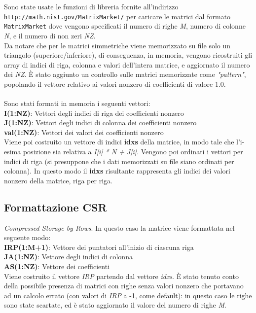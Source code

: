 \documentclass[12pt,halfline,a4paper]{ouparticle}
\begin{document}
Sono state usate le funzioni di libreria fornite all'indirizzo \verb+http://math.nist.gov/MatrixMarket/+ per caricare le matrici dal formato \verb+MatrixMarket+ dove vengono specificati il numero di righe \textit{M}, numero di colonne \textit{N}, e il numero di non zeri \textit{NZ}.\\
Da notare che per le matrici simmetriche viene memorizzato su file solo un triangolo (superiore/inferiore), di conseguenza, in memoria, vengono ricostruiti gli array di indici di riga, colonna e valori dell'intera matrice, e aggiornato il numero dei \textit{NZ}.
È stato aggiunto un controllo sulle matrici memorizzate come \textit{"pattern"}, popolando il vettore relativo ai valori nonzero di coefficienti di valore 1.0.\\\\
Sono stati formati in memoria i seguenti vettori:\\
\indent\textbf{I(1:NZ)}: Vettori degli indici di riga dei coefficienti nonzero\\
\indent\textbf{J(1:NZ)}: Vettori degli indici di colonna dei coefficienti nonzero\\
\indent\textbf{val(1:NZ)}: Vettori dei valori dei coefficienti nonzero\\
Viene poi costruito un vettore di indici \textbf{idxs} della matrice, in modo tale che l'i-esima posizione sia relativa a \textit{I[i] * N + J[i]}. Vengono poi ordinati i vettori per indici di riga (si presuppone che i dati memorizzati su file siano ordinati per colonna). In questo modo il \textbf{idxs} risultante rappresenta gli indici dei valori nonzero della matrice, riga per riga.\\


\subsection{Formattazione CSR}
\label{sec2.2}

\textit{Compressed Storage by Rows}. In questo caso la matrice viene formattata nel seguente modo:\\
\indent\textbf{IRP(1:M+1)}: Vettore dei puntatori all’inizio di ciascuna riga\\
\indent\textbf{JA(1:NZ)}: Vettore degli indici di colonna\\
\indent\textbf{AS(1:NZ)}: Vettore dei coefficienti\\
Viene costruito il vettore \textit{IRP} partendo dal vettore \textit{idxs}. È stato tenuto conto della possibile presenza di matrici con righe senza valori nonzero che portavano ad un calcolo errato (con valori di \textit{IRP} a -1, come default): in questo caso le righe sono state scartate, ed è stato aggiornato il valore del numero di righe \textit{M}.
\end{document}
